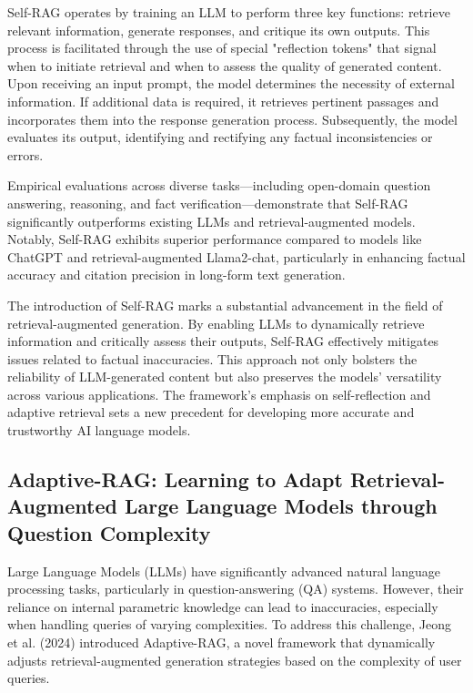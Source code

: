 Self-RAG operates by training an LLM to perform three key functions: retrieve relevant information, generate responses, and critique its own outputs. This process is facilitated through the use of special "reflection tokens" that signal when to initiate retrieval and when to assess the quality of generated content. Upon receiving an input prompt, the model determines the necessity of external information. If additional data is required, it retrieves pertinent passages and incorporates them into the response generation process. Subsequently, the model evaluates its output, identifying and rectifying any factual inconsistencies or errors.

Empirical evaluations across diverse tasks—including open-domain question answering, reasoning, and fact verification—demonstrate that Self-RAG significantly outperforms existing LLMs and retrieval-augmented models. Notably, Self-RAG exhibits superior performance compared to models like ChatGPT and retrieval-augmented Llama2-chat, particularly in enhancing factual accuracy and citation precision in long-form text generation.

The introduction of Self-RAG marks a substantial advancement in the field of retrieval-augmented generation. By enabling LLMs to dynamically retrieve information and critically assess their outputs, Self-RAG effectively mitigates issues related to factual inaccuracies. This approach not only bolsters the reliability of LLM-generated content but also preserves the models' versatility across various applications. The framework's emphasis on self-reflection and adaptive retrieval sets a new precedent for developing more accurate and trustworthy AI language models.


\subsection{Adaptive-RAG: Learning to Adapt Retrieval-Augmented Large Language Models through Question Complexity}

\noindent Large Language Models (LLMs) have significantly advanced natural language processing tasks, particularly in question-answering (QA) systems. However, their reliance on internal parametric knowledge can lead to inaccuracies, especially when handling queries of varying complexities. To address this challenge, Jeong et al. (2024) introduced Adaptive-RAG, a novel framework that dynamically adjusts retrieval-augmented generation strategies based on the complexity of user queries.

